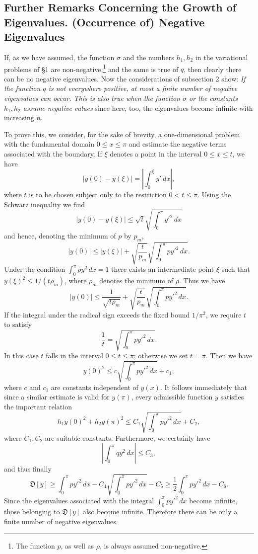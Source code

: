 \subsection{Further Remarks Concerning the Growth of Eigenvalues. (Occurrence of) Negative Eigenvalues}
If, as we have assumed, the function $\sigma$ and the numbers $h_1,h_2$ in the variational problems of \S1 are non-negative,\footnote{The function $p$, as well as $\rho$, is always assumed non-negative.} and the same is true of $q$, then clearly there can be no negative eigenvalues. Now the considerations of subsection 2 show: \emph{If the function $q$ is not everywhere positive, at most a finite number of negative eigenvalues can occur. This is also true when the function $\sigma$ or the constants $h_1,h_2$ assume negative values} since here, too, the eigenvalues become infinite with increasing $n$.

To prove this, we consider, for the sake of brevity, a one-dimensional problem with the fundamental domain $0\le x\le\pi$ and estimate the negative terms associated with the boundary. If $\xi$ denotes a point in the interval $0\le x\le t$, we have
\[
|y(0)-y(\xi)|=\left|\int_0^\xi y'\,dx\right|,
\]
where $t$ is to be chosen subject only to the restriction $0<t\le\pi$. Using the Schwarz inequality we find
\[
|y(0)-y(\xi)|\le\sqrt t\sqrt{\int_0^\pi y'^2\,dx}
\]
and hence, denoting the minimum of $p$ by $p_m$,
\[
|y(0)|\le |y(\xi)|+\sqrt{\frac{t}{p_m}}\sqrt{\int_0^\pi py'^2\,dx}.
\]
Under the condition $\int_0^\pi\rho y^2\,dx=1$ there exists an intermediate point $\xi$ such that $y(\xi)^2\le1/(t\rho_m)$, where $\rho_m$ denotes the minimum of $\rho$. Thus we have
\[
|y(0)|\le\frac1{\sqrt{t\rho_m}}+\sqrt{\frac{t}{p_m}}\sqrt{\int_0^\pi py'^2\,dx}.
\]
If the integral under the radical sign exceeds the fixed bound $1/\pi^2$, we require $t$ to satisfy
\[
\frac1t=\sqrt{\int_0^\pi py'^2\,dx}.
\]
In this case $t$ falls in the interval $0\le t\le\pi$; otherwise we set $t=\pi$. Then we have
\[
y(0)^2\le c\sqrt{\int_0^\pi py'^2\,dx}+c_1,
\]
where $c$ and $c_1$ are constants independent of $y(x)$. It follows immediately that since a similar estimate is valid for $y(\pi)$, every admissible function $y$ satisfies the important relation
\[
h_1y(0)^2+h_2y(\pi)^2\le C_1\sqrt{\int_0^\pi py'^2\,dx}+C_2,
\]
where $C_1,C_2$ are suitable constants. Furthermore, we certainly have
\[
\left|\int_0^\pi qy^2\,dx\right|\le C_3,
\]
and thus finally
\[
\mathfrak D[y]\ge\int_0^\pi py'^2\,dx-C_4\sqrt{\int_0^\pi py'^2\,dx}-C_5
\ge\frac12\int_0^\pi py'^2\,dx-C_6.
\]
Since the eigenvalues associated with the integral $\int_0^\pi py'^2\,dx$ become infinite, those belonging to $\mathfrak D[y]$ also become infinite. Therefore there can be only a finite number of negative eigenvalues.

